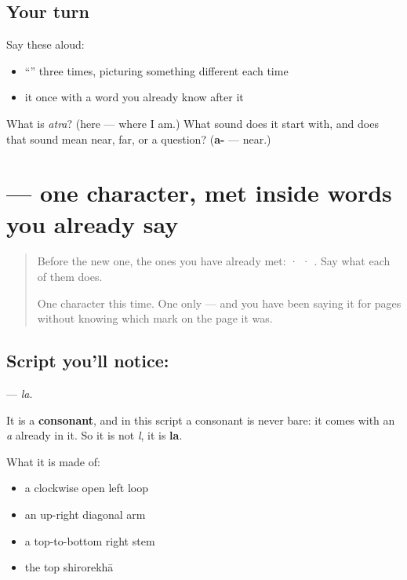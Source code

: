 \subsection*{Your turn}
Say these aloud:

\begin{itemize}
\raggedright
  \item \textquotedblleft{}\textquotedblright{} three times, picturing something different each time
  \item it once with a word you already know after it
\end{itemize}

\begin{tcolorbox}[breakable,colback=teal!4,colframe=teal!35!black,title={Before you move on}]
What is \emph{atra}? (here — where I am.) What sound does it start with, and does that sound mean near, far, or a question? (\textbf{a-} — near.)
\end{tcolorbox}
\section[\texorpdfstring{\sk{ल} (la)}{ल (la)}]{ — one character, met inside words you already say}

\label{lesson:SA-S213-letter-la}



\begin{quote}
Before the new one, the ones you have already met:  ·  · . Say what each of them does.

One character this time. One only — and you have been saying it for pages without knowing which mark on the page it was.
\end{quote}

\subsection*{Script you'll notice: }
\textbf{} — \emph{la}.

It is a \textbf{consonant}, and in this script a consonant is never bare: it comes with an \emph{a} already in it. So it is not \emph{l}, it is \textbf{la}.

What it is made of:

\begin{itemize}
\raggedright
  \item a clockwise open left loop
  \item an up-right diagonal arm
  \item a top-to-bottom right stem
  \item the top shirorekhā
\end{itemize}

